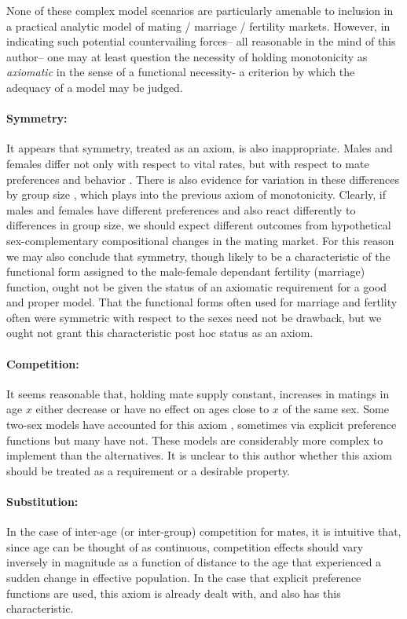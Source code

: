  None of these complex model scenarios are particularly amenable to inclusion in
 a practical analytic model of mating / marriage / fertility markets. However,
 in indicating such potential countervailing forces-- all reasonable in the mind
 of this author-- one may at least question the necessity of holding
 monotonicity as \textit{axiomatic} in the sense of a functional necessity- a
 criterion by which the adequacy of a model may be judged. 

\paragraph{Symmetry:} It appears that symmetry, treated as an axiom, is also
inappropriate. Males and females differ not only with respect to vital rates,
but with respect to mate preferences and behavior \citep{buss1989sex}. There is
also evidence for variation in these differences by group size
\citep{fisman2006gender}, which plays into the previous axiom of monotonicity.
Clearly, if males and females have different preferences and also react
differently to differences in group size, we should expect different outcomes
from hypothetical sex-complementary compositional changes in the mating market.
For this reason we may also conclude that symmetry, though likely to be a
characteristic of the functional form assigned to the male-female
dependant fertility (marriage) function, ought not be given the status of an
axiomatic requirement for a good and proper model. That the functional forms
often used for marriage and fertlity often were symmetric with respect to the
sexes need not be drawback, but we ought not grant this characteristic post hoc
status as an axiom.

\paragraph{Competition:} It seems reasonable that, holding mate supply constant,
increases in matings in age $x$ either decrease or have no effect on ages
close to $x$ of the same sex. Some two-sex models have accounted for this axiom
\citep{henry1972nuptiality, mc1975models, choo2006estimating}, sometimes via
explicit preference functions \citep{parlett1972can, pollard1993interaction} but
many have not. These models are considerably more complex to implement than the 
alternatives. It is unclear to this author whether this axiom should be treated
as a requirement or a desirable property. 

\paragraph{Substitution:} In the case of inter-age (or inter-group) competition
for mates, it is intuitive that, since age can be thought of as
continuous, competition effects should vary inversely in magnitude as a function
of distance to the age that experienced a sudden change in effective
population. In the case that explicit preference functions are used, this axiom
is already dealt with, and \citet{choo2006estimating} also has this
characteristic.

